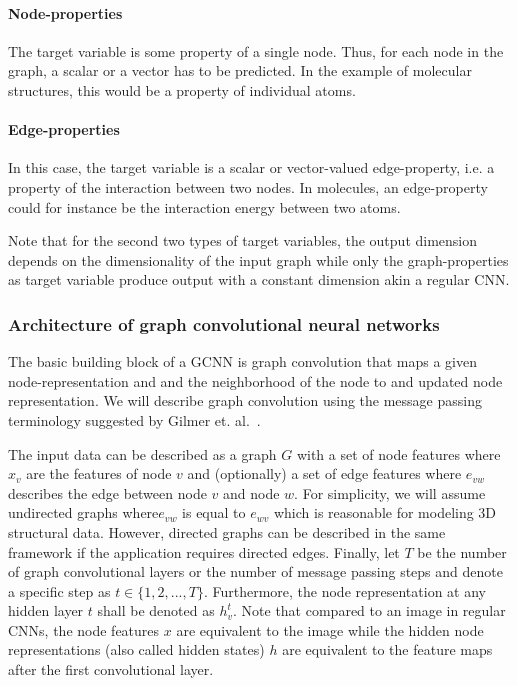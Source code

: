 \paragraph{Node-properties}
The target variable is some property of a single node. Thus, for each node in the graph, a scalar or a vector has to be predicted. In the example of molecular structures, this would be a property of individual atoms.
\paragraph{Edge-properties}
In this case, the target variable is a scalar or vector-valued edge-property, i.e. a property of the interaction between two nodes. In molecules, an edge-property could for instance be the interaction energy between two atoms.

Note that for the second two types of target variables, the output dimension depends on the dimensionality of the input graph while only the graph-properties as target variable produce output with a constant dimension akin a regular CNN.

\subsubsection{Architecture of graph convolutional neural networks}


The basic building block of a GCNN is graph convolution that maps a given node-representation and and the neighborhood of the node to and updated node representation. We will describe graph convolution using the message passing terminology suggested by Gilmer et. al.~\cite{Gilmer2017}.

The input data can be described as a graph $G$ with	a set of node features where $x_v$ are the features of node $v$ and (optionally) a set of edge features where $e_{vw}$ describes the edge between node $v$ and node $w$. For simplicity, we will assume undirected graphs where$e_{vw}$ is equal to $e_{wv}$ which is reasonable for modeling 3D structural data. However, directed graphs can be described in the same framework if the application requires directed edges. Finally, let $T$ be the number of graph convolutional layers or the number of message passing steps and denote a specific step as $t \in \{1, 2, ..., T\}$. Furthermore, the node representation at any hidden layer $t$ shall be denoted as $h_v^t$. Note that compared to an image in regular CNNs, the node features $x$ are equivalent to the image while the hidden node representations (also called hidden states) $h$ are equivalent to the feature maps after the first convolutional layer.

